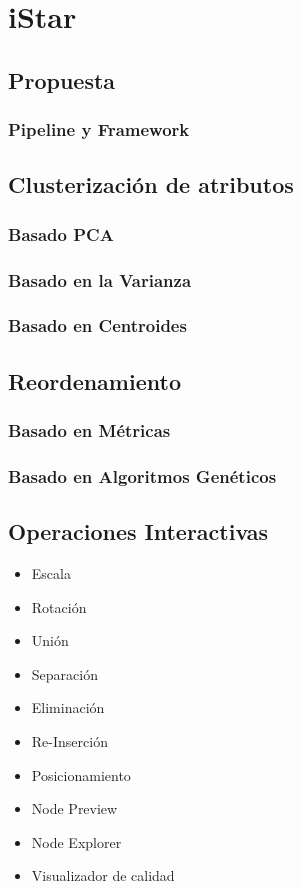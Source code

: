 \chapter{iStar}

\section{Propuesta}

\subsection{Pipeline y Framework}

\section{Clusterización de atributos}
	\subsection{Basado PCA}
	
	\subsection{Basado en la Varianza}
	
	\subsection{Basado en Centroides}

\section{Reordenamiento}

	\subsection{Basado en Métricas}
	
	\subsection{Basado en Algoritmos Genéticos}

\section{Operaciones Interactivas}

	
	\begin{itemize}
		\item Escala
		
	\item Rotación

	\item Unión
	
	\item Separación
	
	\item Eliminación
	
	\item Re-Inserción
	
	\item Posicionamiento
	
	\item Node Preview
	
	\item Node Explorer
	
	\item Visualizador de calidad
\end{itemize}

